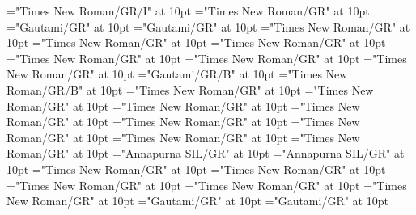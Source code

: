 \documentclass[a4paper]{article}
\begin{document}
\font\spanenexampleggoTeluINexamplessensesensesentryletData="Times New Roman/GR/I" at 10pt
\font\translationsexamplessensesensesentryletData="Times New Roman/GR" at 10pt
\font\translationLdtetranslationsexamplessensesensesentryletData="Gautami/GR" at 10pt
\font\spantetranslationLdtetranslationsexamplessensesensesentryletData="Gautami/GR" at 10pt
\font\spanentranslationLdtetranslationsexamplessensesensesentryletData="Times New Roman/GR" at 10pt
\font\complexformrefsentryletData="Times New Roman/GR" at 10pt
\font\complexformtypecomplexformrefsentryletData="Times New Roman/GR" at 10pt
\font\LexEntryTypepublishStemComplexFormTypeReverseAbbrPubencomplexformtypecomplexformrefsentryletData="Times New Roman/GR" at 10pt
\font\spanenLexEntryTypepublishStemComplexFormTypeReverseAbbrPubencomplexformtypecomplexformrefsentryletData="Times New Roman/GR" at 10pt
\font\spanencomplexformtypecomplexformrefsentryletData="Times New Roman/GR" at 10pt
\font\complexformformggoTeluINcomplexformrefsentryletData="Gautami/GR/B" at 10pt
\font\spanencomplexformformggoTeluINcomplexformrefsentryletData="Times New Roman/GR/B" at 10pt
\font\spanencomplexformrefsentryletData="Times New Roman/GR" at 10pt
\font\pictureRightentryletData="Times New Roman/GR" at 10pt
\font\picturepictureRightentryletData="Times New Roman/GR" at 10pt
\font\pictureCaptionpictureRightentryletData="Times New Roman/GR" at 10pt
\font\CmPicturepublishStemPileThumbnailPubpictureCaptionpictureRightentryletData="Times New Roman/GR" at 10pt
\font\spanenCmPicturepublishStemPileThumbnailPubpictureCaptionpictureRightentryletData="Times New Roman/GR" at 10pt
\font\pictureLabelenpictureCaptionpictureRightentryletData="Times New Roman/GR" at 10pt
\font\spanenpictureLabelenpictureCaptionpictureRightentryletData="Times New Roman/GR" at 10pt
\font\LexSensepublishStemGlossPubLehisensesensesentryletData="Annapurna SIL/GR" at 10pt
\font\spanhiLexSensepublishStemGlossPubLehisensesensesentryletData="Annapurna SIL/GR" at 10pt
\font\spanenLexSensepublishStemGlossPubLehisensesensesentryletData="Times New Roman/GR" at 10pt
\font\translationentranslationsexamplessensesensesentryletData="Times New Roman/GR" at 10pt
\font\xitementranslationentranslationsexamplessensesensesentryletData="Times New Roman/GR" at 10pt
\font\spanenxitementranslationentranslationsexamplessensesensesentryletData="Times New Roman/GR" at 10pt
\font\spanentranslationentranslationsexamplessensesensesentryletData="Times New Roman/GR" at 10pt
\font\xitemtetranslationentranslationsexamplessensesensesentryletData="Gautami/GR" at 10pt
\font\spantexitemtetranslationentranslationsexamplessensesensesentryletData="Gautami/GR" at 10pt
\end{document}

